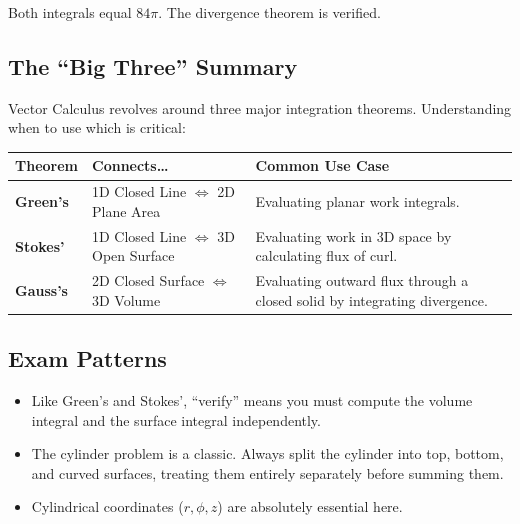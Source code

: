 \documentclass[
]{article}
\providecommand{\tightlist}{%
  \setlength{\itemsep}{0pt}\setlength{\parskip}{0pt}}
\begin{document}
Both integrals equal \(84\pi\). The divergence theorem is verified.

\subsection{The ``Big Three'' Summary}\label{the-big-three-summary}

Vector Calculus revolves around three major integration theorems.
Understanding when to use which is critical:

\begin{longtable}[]{@{}
  >{\raggedright\arraybackslash}p{}
  >{\raggedright\arraybackslash}p{}
  >{\raggedright\arraybackslash}p{}@{}}
\toprule\noalign{}
\begin{minipage}[b]{\linewidth}\raggedright
Theorem
\end{minipage} & \begin{minipage}[b]{\linewidth}\raggedright
Connects\ldots{}
\end{minipage} & \begin{minipage}[b]{\linewidth}\raggedright
Common Use Case
\end{minipage} \\
\midrule\noalign{}
\endhead
\bottomrule\noalign{}
\endlastfoot
\textbf{Green's} & 1D Closed Line \(\iff\) 2D Plane Area & Evaluating
planar work integrals. \\
\textbf{Stokes'} & 1D Closed Line \(\iff\) 3D Open Surface & Evaluating
work in 3D space by calculating flux of curl. \\
\textbf{Gauss's} & 2D Closed Surface \(\iff\) 3D Volume & Evaluating
outward flux through a closed solid by integrating divergence. \\
\end{longtable}

\subsection{Exam Patterns}\label{exam-patterns-16}

\begin{itemize}
\tightlist
\item
  Like Green's and Stokes', ``verify'' means you must compute the volume
  integral and the surface integral independently.
\item
  The cylinder problem is a classic. Always split the cylinder into top,
  bottom, and curved surfaces, treating them entirely separately before
  summing them.
\item
  Cylindrical coordinates (\(r, \phi, z\)) are absolutely essential
  here.
\end{itemize}
\end{document}
